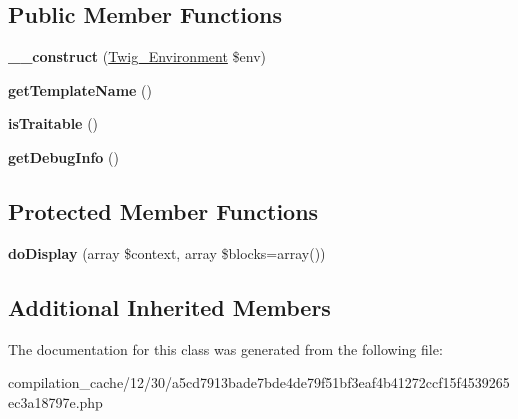 \subsection*{Public Member Functions}
\begin{DoxyCompactItemize}
\item 
\hypertarget{class_____twig_template__1230a5cd7913bade7bde4de79f51bf3eaf4b41272ccf15f4539265ec3a18797e_a4f8326243132c1450a81e0a817aa1be7}{}{\bfseries \+\_\+\+\_\+construct} (\hyperlink{class_twig___environment}{Twig\+\_\+\+Environment} \$env)\label{class_____twig_template__1230a5cd7913bade7bde4de79f51bf3eaf4b41272ccf15f4539265ec3a18797e_a4f8326243132c1450a81e0a817aa1be7}

\item 
\hypertarget{class_____twig_template__1230a5cd7913bade7bde4de79f51bf3eaf4b41272ccf15f4539265ec3a18797e_a621a3ccd148ed8b9e937da6959c98f39}{}{\bfseries get\+Template\+Name} ()\label{class_____twig_template__1230a5cd7913bade7bde4de79f51bf3eaf4b41272ccf15f4539265ec3a18797e_a621a3ccd148ed8b9e937da6959c98f39}

\item 
\hypertarget{class_____twig_template__1230a5cd7913bade7bde4de79f51bf3eaf4b41272ccf15f4539265ec3a18797e_aa9eb89be270f6afc256ef5e272b78a63}{}{\bfseries is\+Traitable} ()\label{class_____twig_template__1230a5cd7913bade7bde4de79f51bf3eaf4b41272ccf15f4539265ec3a18797e_aa9eb89be270f6afc256ef5e272b78a63}

\item 
\hypertarget{class_____twig_template__1230a5cd7913bade7bde4de79f51bf3eaf4b41272ccf15f4539265ec3a18797e_abd0ecb0136f4228db2bd963bfc1e20d7}{}{\bfseries get\+Debug\+Info} ()\label{class_____twig_template__1230a5cd7913bade7bde4de79f51bf3eaf4b41272ccf15f4539265ec3a18797e_abd0ecb0136f4228db2bd963bfc1e20d7}

\end{DoxyCompactItemize}
\subsection*{Protected Member Functions}
\begin{DoxyCompactItemize}
\item 
\hypertarget{class_____twig_template__1230a5cd7913bade7bde4de79f51bf3eaf4b41272ccf15f4539265ec3a18797e_adb62b7c226e07d30f836ed16158d924f}{}{\bfseries do\+Display} (array \$context, array \$blocks=array())\label{class_____twig_template__1230a5cd7913bade7bde4de79f51bf3eaf4b41272ccf15f4539265ec3a18797e_adb62b7c226e07d30f836ed16158d924f}

\end{DoxyCompactItemize}
\subsection*{Additional Inherited Members}


The documentation for this class was generated from the following file\+:\begin{DoxyCompactItemize}
\item 
compilation\+\_\+cache/12/30/a5cd7913bade7bde4de79f51bf3eaf4b41272ccf15f4539265ec3a18797e.\+php\end{DoxyCompactItemize}
